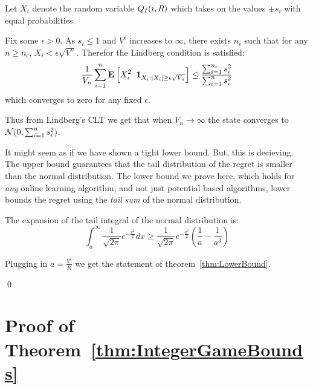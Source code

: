 \documentclass{article}[12pt]
\begin{document}
Let $X_i$ denote the random variable $Q_I(i,R)$ which takes on the values $\pm s_i$ with equal probabilities.

Fix some $\epsilon>0$. As $s_i \leq 1$ and $V^i$ increases to
  $\infty$, there exists $n_{\epsilon}$ such that for any
  $n \geq n_{\epsilon}$, $X_i < \epsilon \sqrt{V^n}$. Therefor the
  Lindberg condition is satisfied:
\[
  \frac{1}{V_n}\sum_{i=1}^n {\bf E}_{}\left[ X_i^2 \;\;{\bf 1}_{X_i: |X_i| \geq \epsilon \sqrt{V_n} }  \right]
  \leq \frac{\sum_{i=1}^{n_\epsilon} s_i^2}{\sum_{i=1}^{n} s_i^2}
  \]
  which converges to zero for any fixed $\epsilon$.

  Thus from Lindberg's CLT we get that when $V_n \to \infty$ the state
  converges to ${\cal N}(0,\sum_{i=1}^n s_i^2)$.

  It might seem as if we have shown a tight lower bound. But, this is
  decieving. The upper bound guarantees that the tail
  distribution of the regret is smaller than the normal distribution.
  The lower bound we prove here, which holds for {\em any}
  online learning algorithm, and not just potential based algorithms,
  lower bounds the regret using the {\em tail sum} of the normal distribution.

  The expansion of the tail integral of the normal distribution is:
  \[
    \int_a^\infty \frac{1}{\sqrt{2 \pi}} e^{-\frac{x^2}{2}} dx
    \geq \frac{1}{\sqrt{2 \pi}} e^{-\frac{a^2}{2}}
    \left( \frac{1}{a} - \frac{1}{a^3}\right)
  \]

Plugging in $a=\frac{V^i}{R}$ we get the statement of theorem~\ref{thm:LowerBound}.
  
  \qed

 




\appendix

\section{Proof of Theorem~\ref{thm:IntegerGameBounds}}
\end{document}
